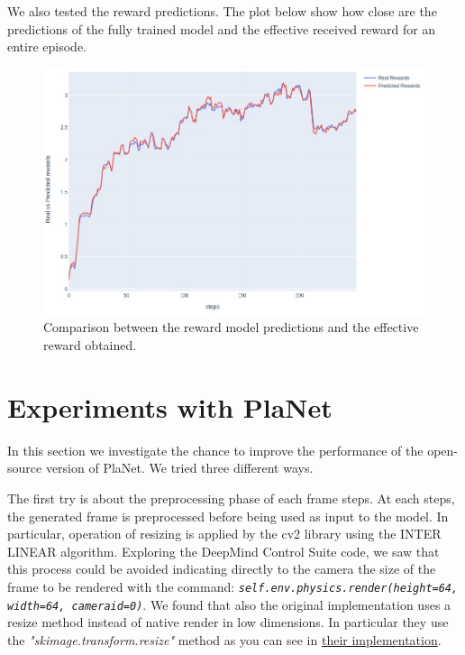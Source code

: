 We also tested the reward predictions. The plot below show how close are the predictions of the fully trained model and the effective received reward for an entire episode.

\begin{figure}[H]
\centering
\includegraphics[width=1. \textwidth, height=.4\textheight]{pictures/rew_vs_pred_rew}
\caption{ Comparison between the reward model predictions and the effective reward obtained.}
\end{figure}


\section{Experiments with PlaNet}

In this section we investigate the chance to improve the performance of the open-source version of PlaNet. We tried three different ways.

The first try is about the preprocessing phase of each frame steps.
At each steps, the generated frame is preprocessed before being used as input to the model. In particular, operation of resizing is applied by the cv2 library using the INTER LINEAR algorithm.
Exploring the DeepMind Control Suite code, we saw that this process could be avoided indicating directly to the camera the size of the frame to be rendered with the command:
\textit{\texttt{self.\textunderscore env.physics.render(height=64, width=64, camera\textunderscore id=0)}}.
We found that also the original implementation uses a resize method instead of native render in low dimensions. In particular they use the \textit{"skimage.transform.resize"} method as you can see in \href{https://github.com/google-research/planet/blob/master/planet/control/wrappers.py}{their implementation}. 


